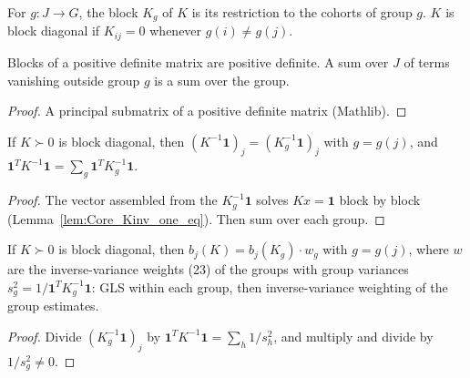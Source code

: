 \begin{definition}[Blocks]\label{def:block}
  \leanok
  For $g \colon J \to G$, the block $K_g$ of $K$ is its restriction to the
  cohorts of group $g$. $K$ is block diagonal if $K_{ij} = 0$ whenever
  $g(i) \ne g(j)$.
\end{definition}

\begin{lemma}\label{lem:block_posDef}
  \leanok
  Blocks of a positive definite matrix are positive definite. A sum over $J$
  of terms vanishing outside group $g$ is a sum over the group.
\end{lemma}
\begin{proof}
  \leanok
  A principal submatrix of a positive definite matrix (Mathlib).
\end{proof}

\begin{theorem}\label{thm:Kinv_one_blockDiag}
  \leanok
  If $K \succ 0$ is block diagonal, then $(K^{-1}\mathbf 1)_j = (K_g^{-1}\mathbf 1)_j$
  with $g = g(j)$, and $\mathbf 1^TK^{-1}\mathbf 1 = \sum_g \mathbf 1^TK_g^{-1}\mathbf 1$.
\end{theorem}
\begin{proof}
  \leanok
  The vector assembled from the $K_g^{-1}\mathbf 1$ solves $Kx = \mathbf 1$ block by
  block (Lemma~\ref{lem:Core_Kinv_one_eq}). Then sum over each group.
\end{proof}

\begin{theorem}\label{thm:glsWeight_blockDiag}
  \leanok
  If $K \succ 0$ is block diagonal, then
  $b_j(K) = b_j(K_g)\cdot w_g$ with $g = g(j)$, where $w$ are the
  inverse-variance weights (23) of the groups with group variances
  $s_g^2 = 1/\mathbf 1^TK_g^{-1}\mathbf 1$: GLS within each group, then
  inverse-variance weighting of the group estimates.
\end{theorem}
\begin{proof}
  \leanok
  Divide $(K_g^{-1}\mathbf 1)_j$ by $\mathbf 1^TK^{-1}\mathbf 1
  = \sum_h 1/s_h^2$, and multiply and divide by $1/s_g^2 \neq 0$.
\end{proof}

